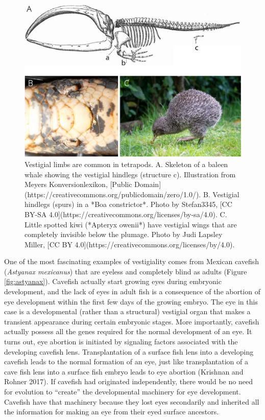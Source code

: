 \documentclass[
]{book}
\begin{document}
\begin{figure}
\includegraphics[width=1\linewidth]{images/vestigial} \caption{Vestigial limbs are common in tetrapods. A. Skeleton of a baleen whale showing the vestigial hindlegs (structure c). Illustration from Meyers Konversionlexikon, [Public Domain](https://creativecommons.org/publicdomain/zero/1.0/). B. Vestigial hindlegs (spurs) in a *Boa constrictor*. Photo by Stefan3345, [CC BY-SA 4.0](https://creativecommons.org/licenses/by-sa/4.0). C. Little spotted kiwi (*Apteryx owenii*) have vestigial wings that are completely invisible below the plumage. Photo by Judi Lapsley Miller, [CC BY 4.0](https://creativecommons.org/licenses/by/4.0).}\label{fig:vestigial}
\end{figure}

One of the most fascinating examples of vestigiality comes from Mexican cavefish (\emph{Astyanax mexicanus}) that are eyeless and completely blind as adults (Figure \ref{fig:astyanax}). Cavefish actually start growing eyes during embryonic development, and the lack of eyes in adult fish is a consequence of the abortion of eye development within the first few days of the growing embryo. The eye in this case is a developmental (rather than a structural) vestigial organ that makes a transient appearance during certain embryonic stages. More importantly, cavefish actually possess all the genes required for the normal development of an eye. It turns out, eye abortion is initiated by signaling factors associated with the developing cavefish lens. Transplantation of a surface fish lens into a developing cavefish leads to the normal formation of an eye, just like transplantation of a cave fish lens into a surface fish embryo leads to eye abortion (Krishnan and Rohner 2017). If cavefish had originated independently, there would be no need for evolution to ``create'' the developmental machinery for eye development. Cavefish have that machinery because they lost eyes secondarily and inherited all the information for making an eye from their eyed surface ancestors.
\end{document}
